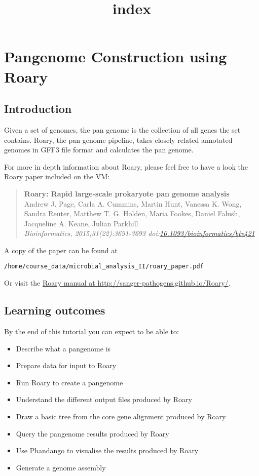 \documentclass[11pt]{article}
\title{index}
\providecommand{\tightlist}{%
      \setlength{\itemsep}{0pt}\setlength{\parskip}{0pt}}
\begin{document}
    \hypertarget{pangenome-construction-using-roary}{%
\section{Pangenome Construction using
Roary}\label{pangenome-construction-using-roary}}

\hypertarget{introduction}{%
\subsection{Introduction}\label{introduction}}

Given a set of genomes, the pan genome is the collection of all genes
the set contains. Roary, the pan genome pipeline, takes closely related
annotated genomes in GFF3 file format and calculates the pan genome.

For more in depth information about Roary, please feel free to have a
look the Roary paper included on the VM:

\begin{quote}
\textbf{Roary: Rapid large-scale prokaryote pan genome analysis}\\
Andrew J. Page, Carla A. Cummins, Martin Hunt, Vanessa K. Wong, Sandra
Reuter, Matthew T. G. Holden, Maria Fookes, Daniel Falush, Jacqueline A.
Keane, Julian Parkhill\\
\textit{Bioinformatics, 2015;31(22):3691-3693
doi:\href{http://bioinformatics.oxfordjournals.org/content/31/22/3691}{10.1093/bioinformatics/btv421}}
\end{quote}

A copy of the paper can be found at

\texttt{/home/course\_data/microbial\_analysis\_II/roary\_paper.pdf}

Or visit the \href{http://sanger-pathogens.github.io/Roary/}{Roary
manual at http://sanger-pathogens.github.io/Roary/}.

\hypertarget{learning-outcomes}{%
\subsection{Learning outcomes}\label{learning-outcomes}}

By the end of this tutorial you can expect to be able to:

\begin{itemize}
\tightlist
\item
  Describe what a pangenome is
\item
  Prepare data for input to Roary
\item
  Run Roary to create a pangenome
\item
  Understand the different output files produced by Roary
\item
  Draw a basic tree from the core gene alignment produced by Roary
\item
  Query the pangenome results produced by Roary
\item
  Use Phandango to visualise the results produced by Roary
\item
  Generate a genome assembly
\end{itemize}
\end{document}
